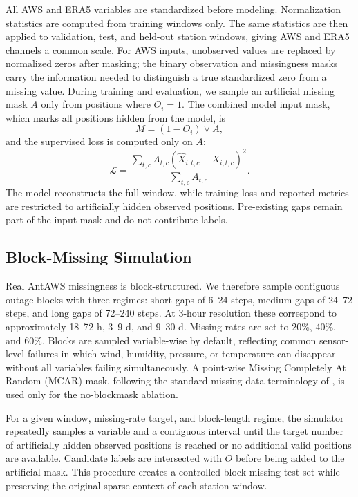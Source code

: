 All AWS and ERA5 variables are standardized before modeling. Normalization statistics are computed from training windows only. The same statistics are then applied to validation, test, and held-out station windows, giving AWS and ERA5 channels a common scale. For AWS inputs, unobserved values are replaced by normalized zeros after masking; the binary observation and missingness masks carry the information needed to distinguish a true standardized zero from a missing value. During training and evaluation, we sample an artificial missing mask $A$ only from positions where $O_i=1$. The combined model input mask, which marks all positions hidden from the model, is
\begin{equation}
M = (1 - O_i) \lor A,
\end{equation}
and the supervised loss is computed only on $A$:
\begin{equation}
\mathcal{L} = \frac{\sum_{t,c} A_{t,c}(\hat{X}_{i,t,c}-X_{i,t,c})^2}{\sum_{t,c} A_{t,c}}.
\end{equation}
The model reconstructs the full window, while training loss and reported metrics are restricted to artificially hidden observed positions. Pre-existing gaps remain part of the input mask and do not contribute labels.

\subsection{Block-Missing Simulation}
Real AntAWS missingness is block-structured. We therefore sample contiguous outage blocks with three regimes: short gaps of 6--24 steps, medium gaps of 24--72 steps, and long gaps of 72--240 steps. At 3-hour resolution these correspond to approximately 18--72 h, 3--9 d, and 9--30 d. Missing rates are set to 20\%, 40\%, and 60\%. Blocks are sampled variable-wise by default, reflecting common sensor-level failures in which wind, humidity, pressure, or temperature can disappear without all variables failing simultaneously. A point-wise Missing Completely At Random (MCAR) mask, following the standard missing-data terminology of \citet{rubin1976inference}, is used only for the no-blockmask ablation.

For a given window, missing-rate target, and block-length regime, the simulator repeatedly samples a variable and a contiguous interval until the target number of artificially hidden observed positions is reached or no additional valid positions are available. Candidate labels are intersected with $O$ before being added to the artificial mask. This procedure creates a controlled block-missing test set while preserving the original sparse context of each station window.

